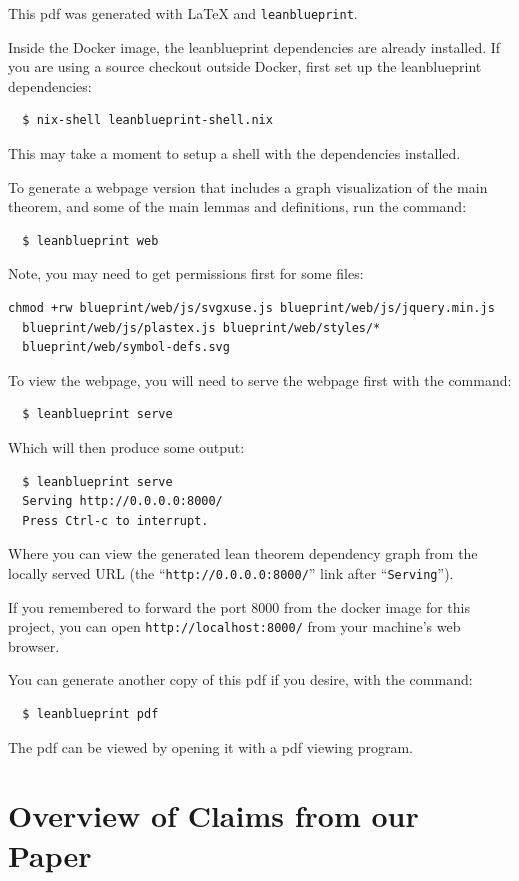 This pdf was generated with \LaTeX{} and \texttt{leanblueprint}.

Inside the Docker image, the leanblueprint dependencies are already installed.
If you are using a source checkout outside Docker, first set up the
leanblueprint dependencies:
\begin{verbatim}
  $ nix-shell leanblueprint-shell.nix
\end{verbatim}
This may take a moment to setup a shell with the dependencies installed.

To generate a webpage version that includes a graph visualization of the main theorem, and some of the main lemmas and definitions, run the command:
\begin{verbatim}
  $ leanblueprint web
\end{verbatim}

Note, you may need to get permissions first for some files:
\begin{verbatim}
chmod +rw blueprint/web/js/svgxuse.js blueprint/web/js/jquery.min.js
  blueprint/web/js/plastex.js blueprint/web/styles/*
  blueprint/web/symbol-defs.svg
\end{verbatim}

To view the webpage, you will need to serve the webpage first with the command:
\begin{verbatim}
  $ leanblueprint serve
\end{verbatim}
Which will then produce some output:
\begin{verbatim}
  $ leanblueprint serve
  Serving http://0.0.0.0:8000/ 
  Press Ctrl-c to interrupt.
\end{verbatim}
Where you can view the generated lean theorem dependency graph from the locally served
URL (the ``\texttt{http://0.0.0.0:8000/}'' link after ``\texttt{Serving}'').

If you remembered to forward the port 8000 from the docker image for this project, you can open
\texttt{http://localhost:8000/} from your machine's web browser.

You can generate another copy of this pdf if you desire, with the command:
\begin{verbatim}
  $ leanblueprint pdf
\end{verbatim}
The pdf can be viewed by opening it with a pdf viewing program.

\section{Overview of Claims from our Paper}

